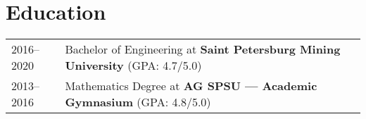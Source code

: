 \documentclass[a4paper,12pt]{article}
\begin{document}
    \section{Education}\label{sec:education}
    \begin{tabularx}{\linewidth}{@{}l X@{}}
        2016--2020 & Bachelor of Engineering at \textbf{Saint Petersburg Mining University} \hfill \normalsize (GPA: 4.7/5.0) \\
        2013--2016 & Mathematics Degree at \textbf{AG SPSU — Academic Gymnasium} \hfill (GPA: 4.8/5.0) \\
    \end{tabularx}

    \vfill
\end{document}
